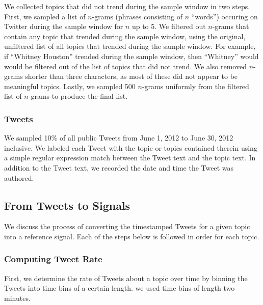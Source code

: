 We collected topics that did not trend during the sample window in two
steps. First, we sampled a list of $n$-grams (phrases consisting of $n$
``words'') occuring on Twitter during the sample window for $n$ up to 5. We
filtered out $n$-grams that contain any topic that trended during the sample
window, using the original, unfiltered list of all topics that trended during
the sample window. For example, if ``Whitney Houston'' trended during the sample
window, then ``Whitney'' would would be filtered out of the list of topics that
did not trend. We also removed $n$-grams shorter than three characters, as most
of these did not appear to be meaningful topics. Lastly, we sampled 500
$n$-grams uniformly from the filtered list of $n$-grams to produce the final
list.

\subsubsection{Tweets}
We sampled 10\% of all public Tweets from June 1, 2012 to June 30, 2012
inclusive. We labeled each Tweet with the topic or topics contained therein
using a simple regular expression match between the Tweet text and the topic
text. In addition to the Tweet text, we recorded the date and time the Tweet was
authored.

\subsection{From Tweets to Signals}
We discuss the process of converting the timestamped Tweets for a given topic
into a reference signal. Each of the steps below is followed in order for each
topic.

\subsubsection{Computing Tweet Rate}
First, we determine the rate of Tweets about a topic over time by binning the
Tweets into time bins of a certain length. we used time bins of length two
minutes. 

